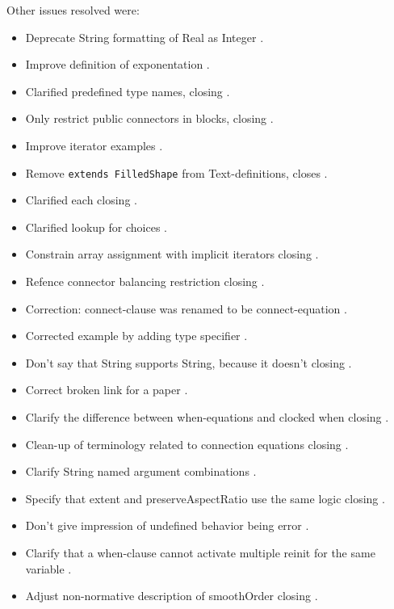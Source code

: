 Other issues resolved were:
\begin{itemize}
\item Deprecate String formatting of Real as Integer .
\item Improve definition of exponentation .
\item Clarified predefined type names,  closing .
\item Only restrict public connectors in blocks,  closing .
\item Improve iterator examples .
\item Remove \lstinline!extends FilledShape! from Text-definitions,  closes .
\item Clarified each  closing .
\item Clarified lookup for choices .
\item Constrain array assignment with implicit iterators  closing .
\item Refence connector balancing restriction  closing .
\item Correction: connect-clause was renamed to be connect-equation .
\item Corrected example by adding type specifier .
\item Don't say that String supports String, because it doesn't  closing .
\item Correct broken link for a paper .
\item Clarify the difference between when-equations and clocked when  closing .
\item Clean-up of terminology related to connection equations  closing .
\item Clarify String named argument combinations  .
\item Specify that extent and preserveAspectRatio use the same logic  closing .
\item Don't give impression of undefined behavior being error .
\item Clarify that a when-clause cannot activate multiple reinit for the same variable .
\item Adjust non-normative description of smoothOrder  closing .

\end{itemize}

